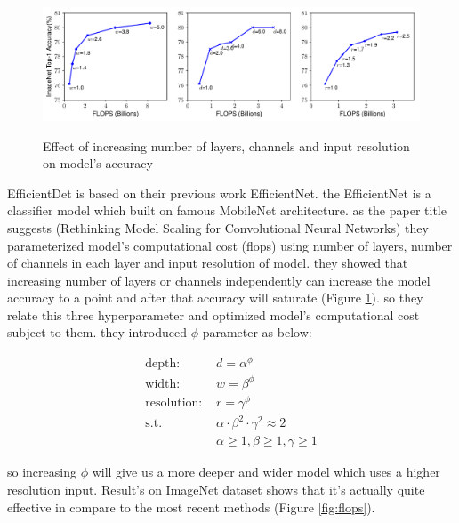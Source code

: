 \documentclass[11pt]{article}
\begin{document}
\begin{figure}
	\centering
	\caption{Effect of increasing number of layers, channels and input resolution on model's accuracy}
	\includegraphics[width=1.0\textwidth]{scale-single}
	\label{fig:scale-single}
\end{figure}

EfficientDet is based on their previous work EfficientNet. the EfficientNet is a classifier model which built on famous MobileNet architecture. as the paper title suggests (Rethinking Model Scaling for Convolutional Neural Networks) they parameterized model's computational cost (flops) using number of layers, number of channels in each layer and input resolution of model. they showed that increasing number of layers or channels independently can increase the model accuracy to a point and after that accuracy will saturate (Figure \ref{fig:scale-single}). so they relate this three hyperparameter and optimized model's computational cost subject to them. they introduced  $\phi$ parameter as below:

\begin{equation}
	\label{eq:optobj} 
	\begin{aligned}
		\text{depth: } & d  = \alpha ^ \phi \\
		\text{width: } & w = \beta ^ \phi \\
		\text{resolution: } & r   =  \gamma ^ \phi  \\
		\text{s.t.    }  & \alpha \cdot \beta ^2 \cdot \gamma ^ 2 \approx 2 \\
		& \alpha \ge 1, \beta \ge 1, \gamma \ge 1 
	\end{aligned}
\end{equation}

so increasing $\phi$ will give us a more deeper and wider model which uses a higher resolution input. Result's on ImageNet dataset shows that it's actually quite effective in compare to the most recent methods (Figure \ref{fig:flops}).
\end{document}
